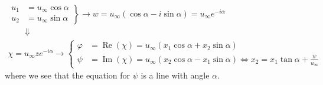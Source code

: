 		\begin{equation}
		\begin{array}{c}
			\left. \begin{aligned}
		u_1 &= u_\infty\cos \alpha\\
		u_2 &= u_\infty \sin \alpha
		\end{aligned}
		\right\} 
		 \rightarrow w = u_\infty(\cos \alpha - i\sin \alpha ) = u_\infty e^{-i\alpha} \\
		 \qquad \Downarrow \qquad \\
		 \chi = u_\infty ze^{-i\alpha} \rightarrow 
		 \left\{
		 \begin{aligned}
		 \varphi &= \operatorname{Re}(\chi ) = u_\infty (x_1\cos \alpha + x_2\sin \alpha )\\
		 \psi &= \operatorname{Im}(\chi ) = u_\infty (x_2\cos \alpha - x_1 \sin \alpha) \Leftrightarrow x_2 = x_1 \tan \alpha + \frac{\psi}{u_\infty}
		 \end{aligned}
		 \right.
		\end{array}
		\end{equation}
		where we see that the equation for $\psi$ is a line with angle $\alpha$. 
		
